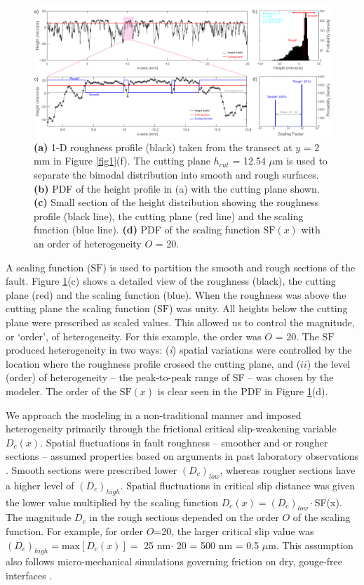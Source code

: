 \documentclass[preprint,1p, 10pt,authoryear]{elsarticle}
\begin{document}
\begin{figure}[ht]
	\centering
	\includegraphics{FIG3_revised.pdf} 
	\caption{ \textbf{(a)} 1-D roughness profile (black) taken from the transect at $y$ = 2 mm in Figure \ref{fig1}(f).  The cutting plane $h_{cut}$ = 12.54 $\mu$m is used to separate the bimodal distribution into smooth and rough surfaces. \textbf{(b)} PDF of the height profile in (a) with the cutting plane shown. \textbf{(c)} Small section of the height distribution showing the roughness profile (black line), the cutting plane (red line) and the scaling function (blue line). \textbf{(d)} PDF of the scaling function $\mathrm{SF}(x)$ with an order of heterogeneity $O$ = 20.}
	\label{fig3}
\end{figure}

A scaling function ($\mathrm{SF}$) is used to partition the smooth and rough sections of the fault. Figure \ref{fig3}(c) shows a detailed view of the roughness (black), the cutting plane (red) and the scaling function (blue). When the roughness was above the cutting plane the scaling function ($\mathrm{SF}$) was unity. All heights below the cutting plane were prescribed as scaled values. This allowed us to control the magnitude, or `order', of heterogeneity. For this example, the order was $O$ = 20. The  $\mathrm{SF}$ produced heterogeneity in two ways: (\textit{i}) spatial variations were controlled by the location where the roughness profile crossed the cutting plane, and ($ii$) the level (order) of heterogeneity -- the peak-to-peak range of SF -- was chosen by the modeler. The order of the $\mathrm{SF}(x)$ is clear seen in the PDF in Figure \ref{fig3}(d).

We approach the modeling in a non-traditional manner and imposed heterogeneity primarily through the frictional critical slip-weakening variable $D_{c}(x)$. Spatial fluctuations in fault roughness -- smoother and or rougher sections -- assumed properties based on arguments in past laboratory observations \citep{Marone1994}. Smooth sections were prescribed lower $(D_{c})_{low}$, whereas rougher sections have a higher level of $(D_{c})_{high}$. Spatial fluctuations in critical slip distance was given the lower value multiplied by the scaling function $D_{c}(x) = (D_{c})_{low}\cdot$SF(x). The magnitude $D_{c}$ in the rough sections depended on the order $O$ of the scaling function. For example, for order $O$=20, the larger critical slip value was $(D_{c})_{high} = \textrm{max}[D_{c}(x)] =$ 25 nm$\cdot$ 20 = 500 nm = 0.5 $\mu$m. This assumption also follows micro-mechanical simulations governing friction on dry, gouge-free interfaces \citep{Yoshioka1996,Yoshioka1997}. 
\end{document}
